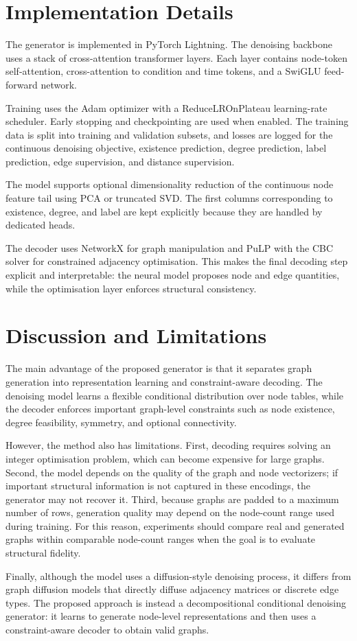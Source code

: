 \section{Implementation Details}
\label{sec:generator:implementation}

The generator is implemented in PyTorch Lightning. The denoising backbone uses a
stack of cross-attention transformer layers. Each layer contains node-token
self-attention, cross-attention to condition and time tokens, and a SwiGLU
feed-forward network.

Training uses the Adam optimizer with a ReduceLROnPlateau learning-rate
scheduler. Early stopping and checkpointing are used when enabled. The training
data is split into training and validation subsets, and losses are logged for the
continuous denoising objective, existence prediction, degree prediction, label
prediction, edge supervision, and distance supervision.

The model supports optional dimensionality reduction of the continuous node
feature tail using PCA or truncated SVD. The first columns corresponding to
existence, degree, and label are kept explicitly because they are handled by
dedicated heads.

The decoder uses NetworkX for graph manipulation and PuLP with the CBC solver
for constrained adjacency optimisation. This makes the final decoding step
explicit and interpretable: the neural model proposes node and edge quantities,
while the optimisation layer enforces structural consistency.

\section{Discussion and Limitations}
\label{sec:generator:discussion}

The main advantage of the proposed generator is that it separates graph
generation into representation learning and constraint-aware decoding. The
denoising model learns a flexible conditional distribution over node tables,
while the decoder enforces important graph-level constraints such as node
existence, degree feasibility, symmetry, and optional connectivity.

However, the method also has limitations. First, decoding requires solving an
integer optimisation problem, which can become expensive for large graphs.
Second, the model depends on the quality of the graph and node vectorizers; if
important structural information is not captured in these encodings, the
generator may not recover it. Third, because graphs are padded to a maximum
number of rows, generation quality may depend on the node-count range used during
training. For this reason, experiments should compare real and generated graphs
within comparable node-count ranges when the goal is to evaluate structural
fidelity.

Finally, although the model uses a diffusion-style denoising process, it differs
from graph diffusion models that directly diffuse adjacency matrices or discrete
edge types. The proposed approach is instead a decompositional conditional
denoising generator: it learns to generate node-level representations and then
uses a constraint-aware decoder to obtain valid graphs.
